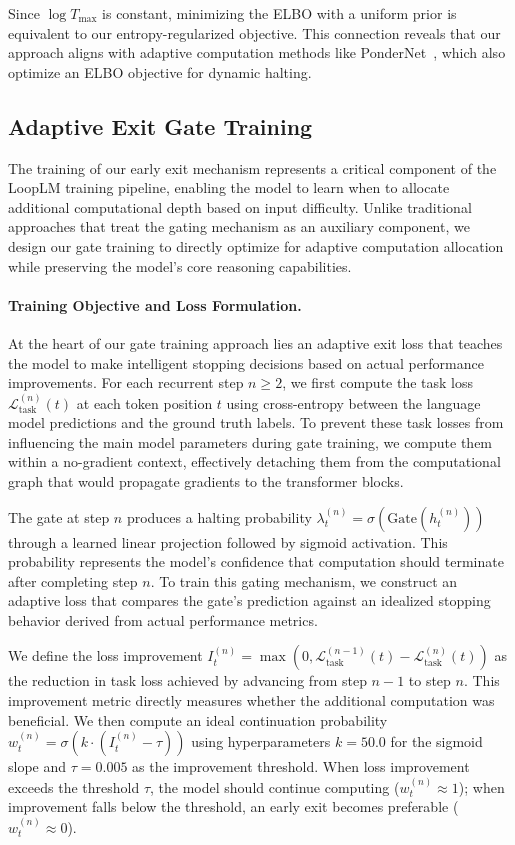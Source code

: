 \documentclass[]{bytedance_seed}
\newcommand{\1}{\mathbf{1}}
\newcommand{\ut}{LoopLM}
\begin{document}
Since $\log T_{\max}$ is constant, minimizing the ELBO with a uniform prior is equivalent to our entropy-regularized objective. This connection reveals that our approach aligns with adaptive computation methods like PonderNet~\cite{banino2021pondernet}, which also optimize an ELBO objective for dynamic halting.

\subsection{Adaptive Exit Gate Training}
\label{ut:adaptive_exit}

The training of our early exit mechanism represents a critical component of the \ut{} training pipeline, enabling the model to learn when to allocate additional computational depth based on input difficulty. Unlike traditional approaches that treat the gating mechanism as an auxiliary component, we design our gate training to directly optimize for adaptive computation allocation while preserving the model's core reasoning capabilities.

\paragraph{Training Objective and Loss Formulation.}
At the heart of our gate training approach lies an adaptive exit loss that teaches the model to make intelligent stopping decisions based on actual performance improvements. For each recurrent step $n \geq 2$, we first compute the task loss $\mathcal{L}_{\text{task}}^{(n)}(t)$ at each token position $t$ using cross-entropy between the language model predictions and the ground truth labels. To prevent these task losses from influencing the main model parameters during gate training, we compute them within a no-gradient context, effectively detaching them from the computational graph that would propagate gradients to the transformer blocks.

The gate at step $n$ produces a halting probability $\lambda^{(n)}_t = \sigma(\text{Gate}(h^{(n)}_t))$ through a learned linear projection followed by sigmoid activation. This probability represents the model's confidence that computation should terminate after completing step $n$. To train this gating mechanism, we construct an adaptive loss that compares the gate's prediction against an idealized stopping behavior derived from actual performance metrics.

We define the loss improvement $I^{(n)}_t = \max(0, \mathcal{L}_{\text{task}}^{(n-1)}(t) - \mathcal{L}_{\text{task}}^{(n)}(t))$ as the reduction in task loss achieved by advancing from step $n-1$ to step $n$. This improvement metric directly measures whether the additional computation was beneficial. We then compute an ideal continuation probability $w^{(n)}_t = \sigma(k \cdot (I^{(n)}_t - \tau))$ using hyperparameters $k=50.0$ for the sigmoid slope and $\tau=0.005$ as the improvement threshold. When loss improvement exceeds the threshold $\tau$, the model should continue computing ($w^{(n)}_t \approx 1$); when improvement falls below the threshold, an early exit becomes preferable ($w^{(n)}_t \approx 0$).
\end{document}
